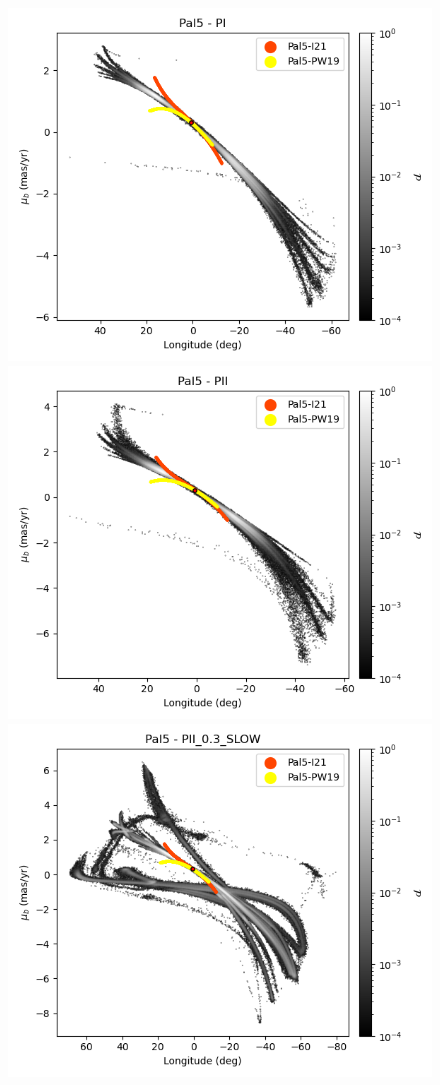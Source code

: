 \begin{figure}[h!]
\begin{center}
                    \includegraphics[clip=true, trim = 0mm 0mm 0mm 0mm, width=0.65\columnwidth]{images/PI_individual_Pal5_galstream-Pal5-l-pm_b.png}
                    \includegraphics[clip=true, trim = 0mm 0mm 0mm 0mm, width=0.65\columnwidth]{images/PII_individual_Pal5_galstream-Pal5-l-pm_b.png}
                    \includegraphics[clip=true, trim = 0mm 0mm 0mm 0mm, width=0.65\columnwidth]{images/PII_0.3_SLOW_individual_Pal5_galstream-Pal5-l-pm_b.png}


\end{center}
\end{figure}
